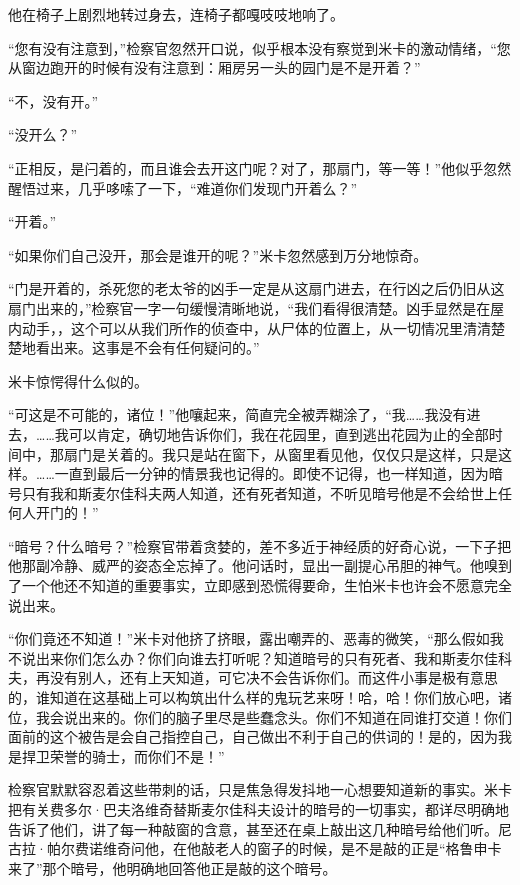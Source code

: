 \par 他在椅子上剧烈地转过身去，连椅子都嘎吱吱地响了。
\par “您有没有注意到，”检察官忽然开口说，似乎根本没有察觉到米卡的激动情绪，“您从窗边跑开的时候有没有注意到：厢房另一头的园门是不是开着？”
\par “不，没有开。”
\par “没开么？”
\par “正相反，是闩着的，而且谁会去开这门呢？对了，那扇门，等一等！”他似乎忽然醒悟过来，几乎哆嗦了一下，“难道你们发现门开着么？”
\par “开着。”
\par “如果你们自己没开，那会是谁开的呢？”米卡忽然感到万分地惊奇。
\par “门是开着的，杀死您的老太爷的凶手一定是从这扇门进去，在行凶之后仍旧从这扇门出来的，”检察官一字一句缓慢清晰地说，“我们看得很清楚。凶手显然是在屋内动手，，这个可以从我们所作的侦查中，从尸体的位置上，从一切情况里清清楚楚地看出来。这事是不会有任何疑问的。”
\par 米卡惊愕得什么似的。
\par “可这是不可能的，诸位！”他嚷起来，简直完全被弄糊涂了，“我……我没有进去，……我可以肯定，确切地告诉你们，我在花园里，直到逃出花园为止的全部时间中，那扇门是关着的。我只是站在窗下，从窗里看见他，仅仅只是这样，只是这样。……一直到最后一分钟的情景我也记得的。即使不记得，也一样知道，因为暗号只有我和斯麦尔佳科夫两人知道，还有死者知道，不听见暗号他是不会给世上任何人开门的！”
\par “暗号？什么暗号？”检察官带着贪婪的，差不多近于神经质的好奇心说，一下子把他那副冷静、威严的姿态全忘掉了。他问话时，显出一副提心吊胆的神气。他嗅到了一个他还不知道的重要事实，立即感到恐慌得要命，生怕米卡也许会不愿意完全说出来。
\par “你们竟还不知道！”米卡对他挤了挤眼，露出嘲弄的、恶毒的微笑，“那么假如我不说出来你们怎么办？你们向谁去打听呢？知道暗号的只有死者、我和斯麦尔佳科夫，再没有别人，还有上天知道，可它决不会告诉你们。而这件小事是极有意思的，谁知道在这基础上可以构筑出什么样的鬼玩艺来呀！哈，哈！你们放心吧，诸位，我会说出来的。你们的脑子里尽是些蠢念头。你们不知道在同谁打交道！你们面前的这个被告是会自己指控自己，自己做出不利于自己的供词的！是的，因为我是捍卫荣誉的骑士，而你们不是！”
\par 检察官默默容忍着这些带刺的话，只是焦急得发抖地一心想要知道新的事实。米卡把有关费多尔·巴夫洛维奇替斯麦尔佳科夫设计的暗号的一切事实，都详尽明确地告诉了他们，讲了每一种敲窗的含意，甚至还在桌上敲出这几种暗号给他们听。尼古拉·帕尔费诺维奇问他，在他敲老人的窗子的时候，是不是敲的正是“格鲁申卡来了”那个暗号，他明确地回答他正是敲的这个暗号。
